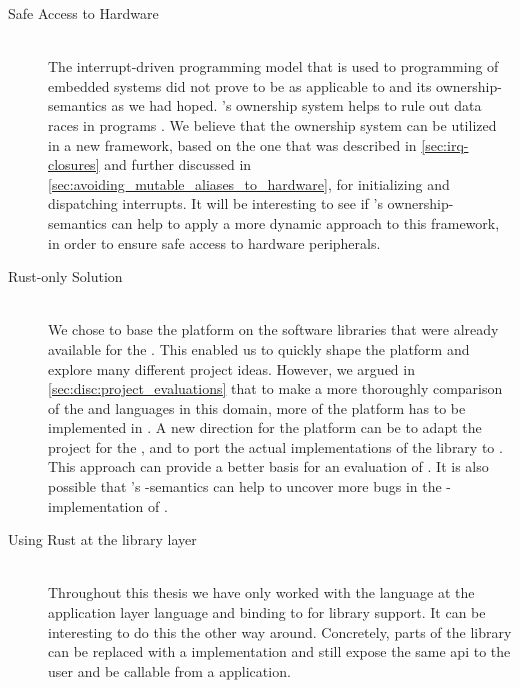 \begin{description}
\item[Safe Access to Hardware] \hfill \\
  The interrupt-driven programming model that is used to programming of embedded systems did not prove to be as applicable to {\rust} and its ownership-semantics as we had hoped.
  {\rust}'s ownership system helps to rule out data races in programs \cite{web:rust_book}.
  We believe that the ownership system can be utilized in a new framework, based on the one that was described in \autoref{sec:irq-closures} and further discussed in \autoref{sec:avoiding_mutable_aliases_to_hardware}, for initializing and dispatching interrupts.
  It will be interesting to see if {\rust}'s ownership-semantics can help to apply a more dynamic approach to this framework, in order to ensure safe access to hardware peripherals.

\item[Rust-only Solution] \hfill \\
  We chose to base the {\rg} platform on the software libraries that were already available for the {\gecko}.
  This enabled us to quickly shape the platform and explore many different project ideas.
  However, we argued in \autoref{sec:disc:project_evaluations} that to make a more thoroughly comparison of the {\C} and {\rust} languages in this domain, more of the platform has to be implemented in {\rust}.
  A new direction for the platform can be to adapt the {\zinc} project for the {\gecko}, and to port the actual implementations of the {\emlib} library to {\rust}.
  This approach can provide a better basis for an evaluation of {\rust}.
  It is also possible that {\rust}'s -semantics can help to uncover more bugs in the {\C}-implementation of {\emlib}.

\item[Using Rust at the library layer] \hfill \\
  Throughout this thesis we have only worked with the {\rust} language at the application layer language and binding to {\C} for library support.
  It can be interesting to do this the other way around.
  Concretely, parts of the {\emlib} library can be replaced with a {\rust} implementation and still expose the same \gls{api} to the user and be callable from a {\C} application.


\end{description}
